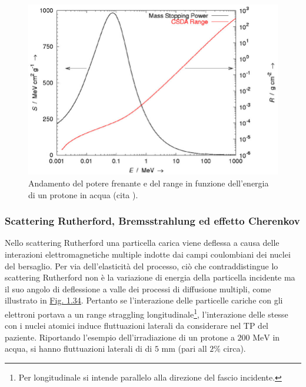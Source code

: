 \documentclass[12pt,a4paper,twoside]{report}
\begin{document}
	\begin{figure}[H]
		\centering
		\includegraphics[width=0.9\linewidth]{adroterapic_range.png}
		\caption{Andamento del potere frenante e del range in funzione dell'energia di un protone in acqua (cita
			).}
		\label{fig:adroterapic_range}
	\end{figure}
	
	\subsubsection{Scattering Rutherford, Bremsstrahlung ed effetto Cherenkov}\label{par:scattering_Rutherford}
	Nello scattering Rutherford una particella carica viene deflessa a causa delle interazioni elettromagnetiche multiple indotte dai campi coulombiani dei nuclei del bersaglio. Per via dell'elasticità del processo, ciò che contraddistingue lo scattering Rutherford non è la variazione di energia della particella incidente ma il suo angolo di deflessione a valle dei processi di diffusione multipli, come illustrato in \hyperref[fig:rutherford_scattering]{Fig. 1.34}. Pertanto se l'interazione delle particelle cariche con gli elettroni portava a un range straggling longitudinale\footnote{Per longitudinale si intende parallelo alla direzione del fascio incidente.}, l'interazione delle stesse con i nuclei atomici induce fluttuazioni laterali da considerare nel TP del paziente. Riportando l'esempio dell'irradiazione di un protone a $200\mbox{ MeV}$ in acqua, si hanno fluttuazioni laterali di di $5\mbox{ mm}$ (pari all $2\%$ circa).
	
\end{document}
